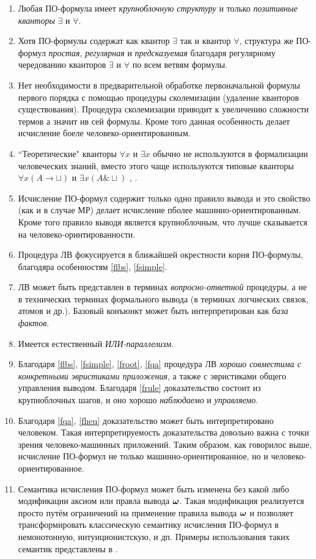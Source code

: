 \begin{enumerate}
\item\label{flbs} Любая ПО-формула имеет {\em крупноблочную структуру} и только {\em позитивные кванторы} $\exists$ и $\forall$.
%
\item\label{fsimple} Хотя ПО-формулы содержат как квантор $\exists$ так и квантор $\forall$, структура же ПО-формул {\em простая}, {\em регулярная} и {\em предсказуемая} благодаря регулярному чередованию кванторов $\exists$ и $\forall$ по всем ветвям формулы.
%
\item Нет необходимости в предварительной обработке первоначальной формулы первого порядка с помощью процедуры сколемизации (удаление кванторов существования). Процедура сколемизации приводит к увеличению сложности термов а значит ив сей формулы. Кроме того данная особенность делает исчисление боеле человеко-ориентированным.
%
\item ``Теоретические" кванторы $\forall x$ и $\exists x$ обычно не используются в формализации человеческих знаний, вместо этого чаще используются типовые кванторы $\forall x(A \rightarrow \sqcup)$ и $\exists x(A \& \sqcup)$ \cite{Bourbaki}, \cite{ICDS2000}.
%
\item\label{frule} Исчисление ПО-формул содержит только одно правило вывода и это свойство (как и в случае МР) делает исчисление пболее машинно-ориентированным. Кроме того правило выводя является крупноблочным, что лучше сказывается на человеко-оринтированности.
%
\item\label{froot} Процедура ЛВ фокусируется в ближайшей окрестности корня ПО-формулы, благодяра особенностям \ref{flbs}, \ref{fsimple}.
%
\item\label{fqa} ЛВ может быть представлен в терминах {\em вопросно-ответной} процедуры, а не в технических терминах формального вывода (в терминах логчиеских связок, атомов и др.). Базовый конъюнкт может быть интерпретирован как {\em база фактов}.
%
\item Имеется естественный {\em ИЛИ-параллелизм}.
%
\item\label{fheu} Благодаря \ref{flbs}, \ref{fsimple}, \ref{froot}, \ref{fqa} процедура ЛВ {\em хорошо совместима с конкретными эвристиками приложения}, а также с эвристиками общего управления выводом. Благодаря \ref{frule} доказательство состоит из крупноблочных шагов, и оно хорошо {\em наблюдаемо} и {\em управляемо}.
%
\item Благодаря \ref{fqa}, \ref{fheu} доказательство может быть интерпретировано человеком. Такая интерпретируемость доказательства довольно важна с точки зрения человеко-машинных приложений. Таким образом, как говорилос выше, исчисление ПО-формул не только машинно-ориентированное, но и человеко-ориентированное.
%
\item Семантика исчисления ПО-формул может быть изменена без какой либо модификации аксиом или правла вывода $\boldsymbol{\omega}$. Такая модификация реализуется просто путём ограничений на применение правила вывода $\boldsymbol{\omega}$ и позволяет трансформировать классическую семантику исчисления ПО-формул в немонотонную, интуиционистскую, и дп. Примеры использования таких семантик представлены в \cite{ICDS2000}.
\end{enumerate}


